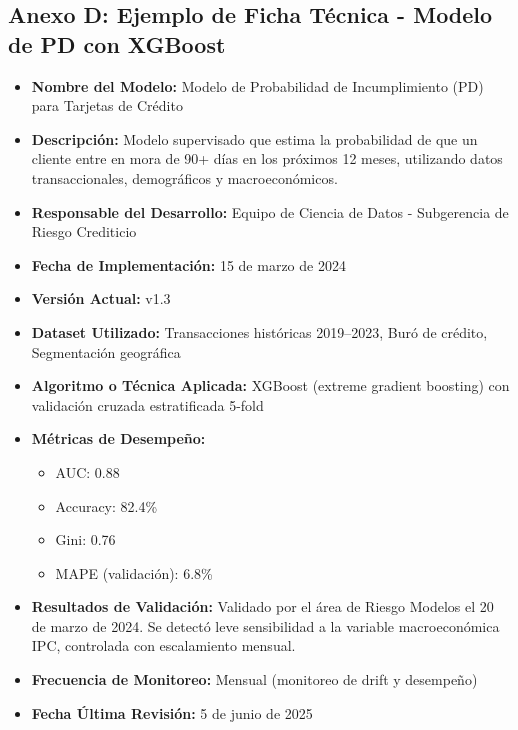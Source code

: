 \documentclass[12pt]{article}
\begin{document}
\subsection*{Anexo D: Ejemplo de Ficha Técnica - Modelo de PD con XGBoost}
\begin{itemize}
  \item \textbf{Nombre del Modelo:} Modelo de Probabilidad de Incumplimiento (PD) para Tarjetas de Crédito
  \item \textbf{Descripción:} Modelo supervisado que estima la probabilidad de que un cliente entre en mora de 90+ días en los próximos 12 meses, utilizando datos transaccionales, demográficos y macroeconómicos.
  \item \textbf{Responsable del Desarrollo:} Equipo de Ciencia de Datos - Subgerencia de Riesgo Crediticio
  \item \textbf{Fecha de Implementación:} 15 de marzo de 2024
  \item \textbf{Versión Actual:} v1.3
  \item \textbf{Dataset Utilizado:} Transacciones históricas 2019–2023, Buró de crédito, Segmentación geográfica
  \item \textbf{Algoritmo o Técnica Aplicada:} XGBoost (extreme gradient boosting) con validación cruzada estratificada 5-fold
  \item \textbf{Métricas de Desempeño:}
    \begin{itemize}
        \item AUC: 0.88
        \item Accuracy: 82.4\%
        \item Gini: 0.76
        \item MAPE (validación): 6.8\%
    \end{itemize}
  \item \textbf{Resultados de Validación:} Validado por el área de Riesgo Modelos el 20 de marzo de 2024. Se detectó leve sensibilidad a la variable macroeconómica IPC, controlada con escalamiento mensual.
  \item \textbf{Frecuencia de Monitoreo:} Mensual (monitoreo de drift y desempeño)
  \item \textbf{Fecha Última Revisión:} 5 de junio de 2025
\end{itemize}
\end{document}
